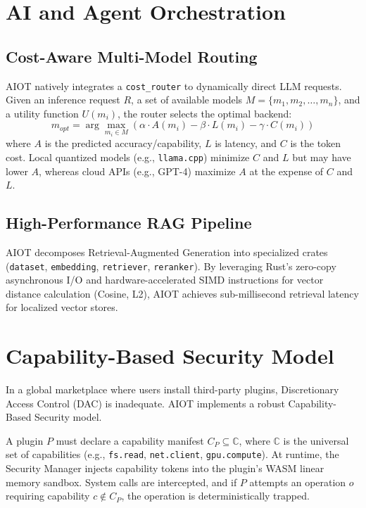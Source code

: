 \documentclass[conference,compsoc]{IEEEtran}
\begin{document}
\section{AI and Agent Orchestration}
\subsection{Cost-Aware Multi-Model Routing}
AIOT natively integrates a \texttt{cost\_router} to dynamically direct LLM requests. Given an inference request $R$, a set of available models $M = \{m_1, m_2, \dots, m_n\}$, and a utility function $U(m_i)$, the router selects the optimal backend:
\begin{equation}
    m_{opt} = \arg\max_{m_i \in M} \left( \alpha \cdot A(m_i) - \beta \cdot L(m_i) - \gamma \cdot C(m_i) \right)
\end{equation}
where $A$ is the predicted accuracy/capability, $L$ is latency, and $C$ is the token cost. Local quantized models (e.g., \texttt{llama.cpp}) minimize $C$ and $L$ but may have lower $A$, whereas cloud APIs (e.g., GPT-4) maximize $A$ at the expense of $C$ and $L$.

\subsection{High-Performance RAG Pipeline}
AIOT decomposes Retrieval-Augmented Generation into specialized crates (\texttt{dataset}, \texttt{embedding}, \texttt{retriever}, \texttt{reranker}). By leveraging Rust's zero-copy asynchronous I/O and hardware-accelerated SIMD instructions for vector distance calculation (Cosine, L2), AIOT achieves sub-millisecond retrieval latency for localized vector stores.

\section{Capability-Based Security Model}
In a global marketplace where users install third-party plugins, Discretionary Access Control (DAC) is inadequate. AIOT implements a robust Capability-Based Security model.

A plugin $P$ must declare a capability manifest $C_P \subseteq \mathbb{C}$, where $\mathbb{C}$ is the universal set of capabilities (e.g., \texttt{fs.read}, \texttt{net.client}, \texttt{gpu.compute}). At runtime, the Security Manager injects capability tokens into the plugin's WASM linear memory sandbox. System calls are intercepted, and if $P$ attempts an operation $o$ requiring capability $c \notin C_P$, the operation is deterministically trapped.
\end{document}
